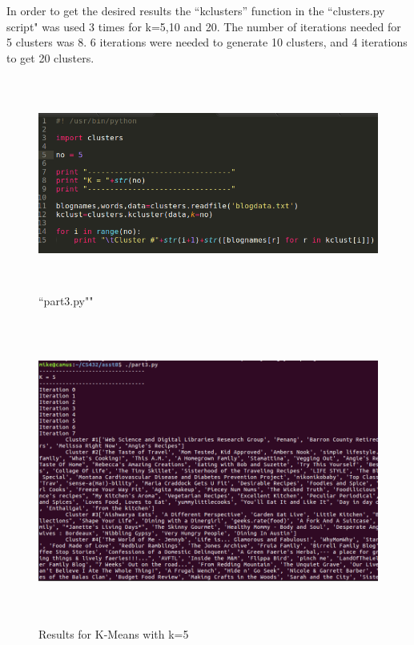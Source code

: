 \documentclass{article}
\begin{document}
In order to get the desired results the ``kclusters'' function in the ``clusters.py script" was used 3 times for k=5,10 and 20.
The number of iterations needed for 5 clusters was 8. 6 iterations were needed to generate 10 clusters, and 4 iterations to get 20 clusters. 


\begin{figure}[H]
 \centering
 	\includegraphics[height=7cm]{p3.png}
  \caption{``part3.py""}
\end{figure}

\begin{figure}[H]
 \centering
 	\includegraphics[height=10cm]{q3k5.png}
  \caption{Results for K-Means with k=5}
\end{figure}
\end{document}
